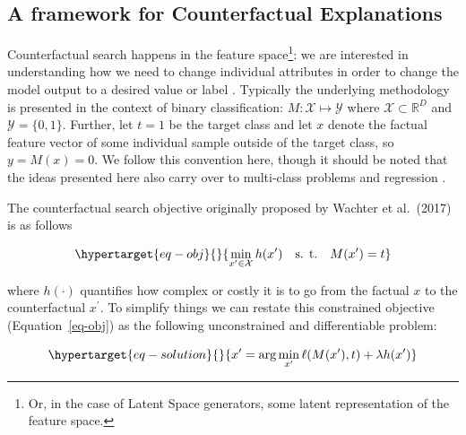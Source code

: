 \documentclass[
  letterpaper,
  DIV=11,
  numbers=noendperiod]{scrartcl}
\begin{document}
\hypertarget{sec-method}{%
\subsection{A framework for Counterfactual
Explanations}\label{sec-method}}

Counterfactual search happens in the feature space\footnote{Or, in the
  case of Latent Space generators, some latent representation of the
  feature space.}: we are interested in understanding how we need to
change individual attributes in order to change the model output to a
desired value or label \cite{molnar2020interpretable}. Typically the
underlying methodology is presented in the context of binary
classification: \(M: \mathcal{X} \mapsto \mathcal{Y}\) where
\(\mathcal{X}\subset\mathbb{R}^D\) and \(\mathcal{Y}=\{0,1\}\). Further,
let \(t=1\) be the target class and let \(x\) denote the factual feature
vector of some individual sample outside of the target class, so
\(y=M(x)=0\). We follow this convention here, though it should be noted
that the ideas presented here also carry over to multi-class problems
and regression \cite{molnar2020interpretable}.

The counterfactual search objective originally proposed by Wachter et
al.~(2017) \cite{wachter2017counterfactual} is as follows

\begin{equation}\protect\hypertarget{eq-obj}{}{
\min_{x^\prime \in \mathcal{X}} h(x^\prime) \ \ \ \mbox{s. t.} \ \ \ M(x^\prime) = t
}\label{eq-obj}\end{equation}

where \(h(\cdot)\) quantifies how complex or costly it is to go from the
factual \(x\) to the counterfactual \(x^\prime\). To simplify things we
can restate this constrained objective (Equation~\ref{eq-obj}) as the
following unconstrained and differentiable problem:

\begin{equation}\protect\hypertarget{eq-solution}{}{
x^\prime = \arg \min_{x^\prime}  \ell(M(x^\prime),t) + \lambda h(x^\prime)
}\label{eq-solution}\end{equation}
\end{document}

